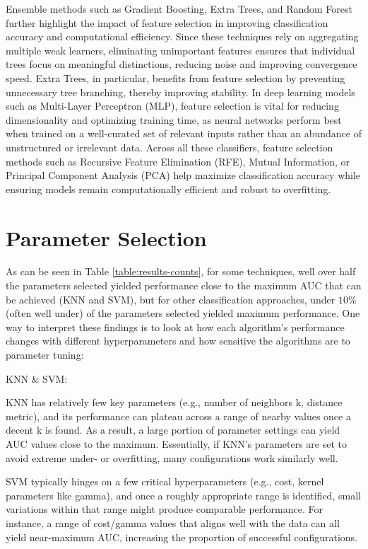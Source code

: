 \documentclass[letterpaper, notitlepage]{report}
\begin{document}
Ensemble methods such as Gradient Boosting, Extra Trees, and Random Forest further highlight the impact of feature selection in improving classification accuracy and computational efficiency. Since these techniques rely on aggregating multiple weak learners, eliminating unimportant features ensures that individual trees focus on meaningful distinctions, reducing noise and improving convergence speed. Extra Trees, in particular, benefits from feature selection by preventing unnecessary tree branching, thereby improving stability. In deep learning models such as Multi-Layer Perceptron (MLP), feature selection is vital for reducing dimensionality and optimizing training time, as neural networks perform best when trained on a well-curated set of relevant inputs rather than an abundance of unstructured or irrelevant data. Across all these classifiers, feature selection methods such as Recursive Feature Elimination (RFE), Mutual Information, or Principal Component Analysis (PCA) help maximize classification accuracy while ensuring models remain computationally efficient and robust to overfitting.

\section{Parameter Selection}
As can be seen in Table \ref{table:results-counts}, for some techniques, well over half the parameters selected yielded performance close to the maximum AUC that can be achieved (KNN and SVM), but for other classification approaches, under $10\%$ (often well under) of the parameters selected yielded maximum performance. One way to interpret these findings is to look at how each algorithm’s performance changes with different hyperparameters and how sensitive the algorithms are to parameter tuning:

KNN \& SVM:

KNN has relatively few key parameters (e.g., number of neighbors k, distance metric), and its performance can plateau across a range of nearby values once a decent k is found. As a result, a large portion of parameter settings can yield AUC values close to the maximum. Essentially, if KNN’s parameters are set to avoid extreme under- or overfitting, many configurations work similarly well.

SVM typically hinges on a few critical hyperparameters (e.g., cost, kernel parameters like gamma), and once a roughly appropriate range is identified, small variations within that range might produce comparable performance. For instance, a range of cost/gamma values that aligns well with the data can all yield near-maximum AUC, increasing the proportion of successful configurations.
\end{document}
